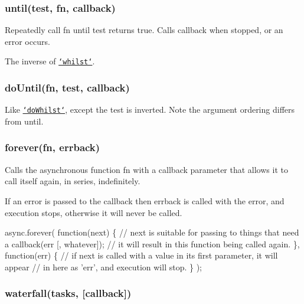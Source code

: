  \subsubsection*{until(test, fn, callback)}

Repeatedly call {\ttfamily fn} until {\ttfamily test} returns {\ttfamily true}. Calls {\ttfamily callback} when stopped, or an error occurs.

The inverse of \href{#whilst}{\tt `whilst`}. 



\label{_doUntil}%
 \subsubsection*{do\+Until(fn, test, callback)}

Like \href{#doWhilst}{\tt `do\+Whilst`}, except the {\ttfamily test} is inverted. Note the argument ordering differs from {\ttfamily until}. 



\label{_forever}%
 \subsubsection*{forever(fn, errback)}

Calls the asynchronous function {\ttfamily fn} with a callback parameter that allows it to call itself again, in series, indefinitely.

If an error is passed to the callback then {\ttfamily errback} is called with the error, and execution stops, otherwise it will never be called.


\begin{DoxyCode}
async.forever(
    \textcolor{keyword}{function}(next) \{
        \textcolor{comment}{// next is suitable for passing to things that need a callback(err [, whatever]);}
        \textcolor{comment}{// it will result in this function being called again.}
    \},
    \textcolor{keyword}{function}(err) \{
        \textcolor{comment}{// if next is called with a value in its first parameter, it will appear}
        \textcolor{comment}{// in here as 'err', and execution will stop.}
    \}
);
\end{DoxyCode}
 



\label{_waterfall}%
 \subsubsection*{waterfall(tasks, \mbox{[}callback\mbox{]})}

